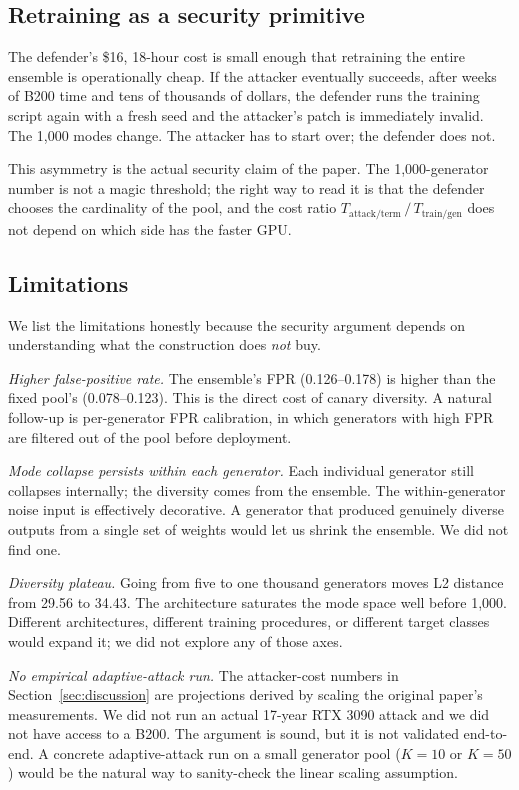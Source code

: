 \documentclass[conference]{IEEEtran}
\begin{document}
\subsection{Retraining as a security primitive}

The defender's \$16, 18-hour cost is small enough that retraining the
entire ensemble is operationally cheap. If the attacker eventually
succeeds, after weeks of B200 time and tens of thousands of dollars,
the defender runs the training script again with a fresh seed and the
attacker's patch is immediately invalid. The 1{,}000 modes change. The
attacker has to start over; the defender does not.

This asymmetry is the actual security claim of the paper. The
1{,}000-generator number is not a magic threshold; the right way to
read it is that the defender chooses the cardinality of the pool, and
the cost ratio
$T_{\text{attack/term}}\,/\,T_{\text{train/gen}}$ does not depend on
which side has the faster GPU.

\subsection{Limitations}
\label{ssec:limits}

We list the limitations honestly because the security argument depends
on understanding what the construction does \emph{not} buy.

\textit{Higher false-positive rate.} The ensemble's FPR (0.126--0.178)
is higher than the fixed pool's (0.078--0.123). This is the direct cost
of canary diversity. A natural follow-up is per-generator FPR
calibration, in which generators with high FPR are filtered out of the
pool before deployment.

\textit{Mode collapse persists within each generator.} Each individual
generator still collapses internally; the diversity comes from the
ensemble. The within-generator noise input is effectively decorative.
A generator that produced genuinely diverse outputs from a single set
of weights would let us shrink the ensemble. We did not find one.

\textit{Diversity plateau.} Going from five to one thousand generators
moves L2 distance from 29.56 to 34.43. The architecture saturates the
mode space well before 1{,}000. Different architectures, different
training procedures, or different target classes would expand it; we
did not explore any of those axes.

\textit{No empirical adaptive-attack run.} The attacker-cost numbers in
Section~\ref{sec:discussion} are projections derived by scaling the
original paper's measurements. We did not run an actual 17-year RTX 3090
attack and we did not have access to a B200. The argument is sound, but
it is not validated end-to-end. A concrete adaptive-attack run on a
small generator pool ($K{=}10$ or $K{=}50$) would be the natural way to
sanity-check the linear scaling assumption.
\end{document}
